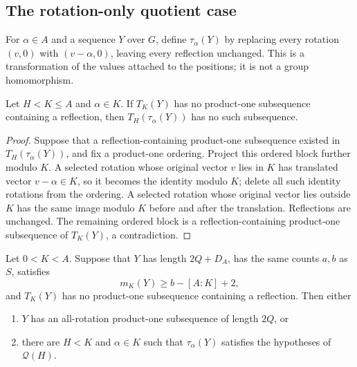 \subsection{The rotation-only quotient case}
\label{subsec:rotation-quotient}

For \(\alpha\in A\) and a sequence \(Y\) over \(G\), define
\(\tau_\alpha(Y)\) by replacing every rotation \((v,0)\) with
\((v-\alpha,0)\), leaving every reflection unchanged. This is a
transformation of the values attached to the positions; it is not a
group homomorphism.

\begin{lemma}
\label{lem:quotient-obstruction}
Let \(H<K\le A\) and \(\alpha\in K\). If \(T_K(Y)\) has no
product-one subsequence containing a reflection, then
\(T_H(\tau_\alpha(Y))\) has no such subsequence.
\end{lemma}

\begin{proof}
Suppose that a reflection-containing product-one subsequence existed in
\(T_H(\tau_\alpha(Y))\), and fix a product-one ordering. Project this
ordered block further modulo \(K\). A selected rotation whose original
vector \(v\) lies in \(K\) has translated vector \(v-\alpha\in K\), so
it becomes the identity modulo \(K\); delete all such identity rotations
from the ordering. A selected rotation whose original vector lies
outside \(K\) has the same image modulo \(K\) before and after the
translation. Reflections are unchanged. The remaining ordered block is
a reflection-containing product-one subsequence of \(T_K(Y)\), a
contradiction.
\end{proof}

\begin{proposition}\label{prop:rotation-quotient}
Let \(0<K<A\). Suppose that \(Y\) has length \(2Q+D_A\), has the same
counts \(a,b\) as \(S\), satisfies
\[
  m_K(Y)\ge b-[A:K]+2,
\]
and \(T_K(Y)\) has no product-one subsequence containing a reflection.
Then either
\begin{enumerate}
\item \(Y\) has an all-rotation product-one subsequence of length
      \(2Q\), or
\item there are \(H<K\) and \(\alpha\in K\) such that
      \(\tau_\alpha(Y)\) satisfies the hypotheses of \(\mathcal Q(H)\).
\end{enumerate}
\end{proposition}

